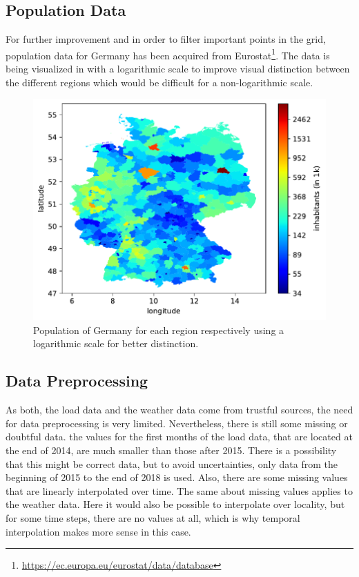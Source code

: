 \subsection*{Population Data}

For further improvement and in order to filter important points in the grid, population data for Germany has been acquired from Eurostat\footnote{\url{https://ec.europa.eu/eurostat/data/database}}. The data is being visualized in  with a logarithmic scale to improve visual distinction between the different regions which would be difficult for a non-logarithmic scale.\\

\begin{figure}[h!]%
\centering
\includegraphics[width=\textwidth]{plots/demo/demo2018_logscale}%
\caption{Population of Germany for each region respectively using a logarithmic scale for better distinction.}%
\label{fig:demo2018_logscale}%
\end{figure}


\subsection*{Data Preprocessing}

As both, the load data and the weather data come from trustful sources, the need for data preprocessing is very limited. Nevertheless, there is still some missing or doubtful data. \Eg the values for the first months of the load data, that are located at the end of 2014, are much smaller than those after 2015. There is a possibility that this might be correct data, but to avoid uncertainties, only data from the beginning of 2015 to the end of 2018 is used. Also, there are some missing values that are linearly interpolated over time. The same about missing values applies to the weather data. Here it would also be possible to interpolate over locality, but for some time steps, there are no values at all, which is why temporal interpolation makes more sense in this case.\\



